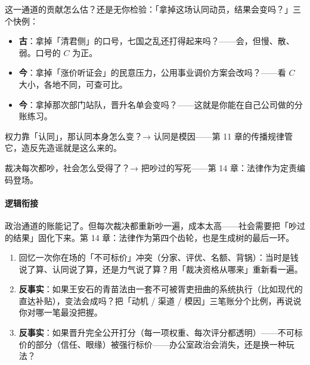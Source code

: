 \documentclass[../../main2.tex]{subfiles}
\begin{document}
这一通道的贡献怎么估？还是无你检验：「拿掉这场认同动员，结果会变吗？」三个快例：

\begin{itemize}
	\item \textbf{古}：拿掉「清君侧」的口号，七国之乱还打得起来吗？——会，但慢、散、弱。口号的 $C$ 为正。
	\item \textbf{今}：拿掉「涨价听证会」的民意压力，公用事业调价方案会改吗？——看 $C$ 大小，各地不同，可查可比。
	\item \textbf{今}：拿掉那次部门站队，晋升名单会变吗？——这就是你能在自己公司做的分账练习。
\end{itemize}

\begin{reader_anticipation}
	\item 权力靠「认同」，那认同本身怎么变？→ 认同是模因——第 11 章的传播规律管它，造反先造谣就是这么来的。
	\item 裁决每次都吵，社会怎么受得了？→ 把吵过的写死——第 14 章：法律作为定责编码登场。
\end{reader_anticipation}

\paragraph*{逻辑衔接}
	政治通道的账能记了。但每次裁决都重新吵一遍，成本太高——社会需要把「吵过的结果」固化下来。第 14 章：法律作为第四个齿轮，也是生成树的最后一环。

\begin{thinkbox}
\begin{enumerate}
	\item 回忆一次你在场的「不可标价」冲突（分家、评优、名额、背锅）：当时是钱说了算、认同说了算，还是力气说了算？用「裁决资格从哪来」重新看一遍。
	\item \textbf{反事实}：如果王安石的青苗法由一套不可被胥吏扭曲的系统执行（比如现代的直达补贴），变法会成吗？把「动机 / 渠道 / 模因」三笔账分个比例，再说说你对哪一笔最没把握。
	\item \textbf{反事实}：如果晋升完全公开打分（每一项权重、每次评分都透明）——不可标价的部分（信任、眼缘）被强行标价——办公室政治会消失，还是换一种玩法？
\end{enumerate}
\end{thinkbox}
\end{document}
